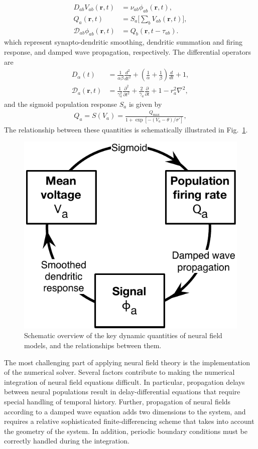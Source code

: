 \documentclass[preprint,review,10pt,authoryear,letterpaper]{elsarticle}
\begin{document}
\begin{align}
	\label{eq:summation}
	D_{ab}V_{ab}(\mathbf{r},t) &= \nu_{ab}\phi_{ab}(\mathbf{r},t),\\
	\label{eq:sigm_sum}
	Q_a(\mathbf{r},t) &= S_a \big[\sum_b V_{ab}(\mathbf{r},t) \big],\\
	\mathcal{D}_{ab}\phi_{ab}(\mathbf{r},t) &= Q_b(\mathbf{r},t-\tau_{ab}).
\end{align}
which represent synapto-dendritic smoothing, dendritic summation and firing response, and damped wave propagation, respectively. The differential operators are
\begin{align}
\label{eq:dendrite}
	D_\alpha(t) &= \frac{1}{\alpha\beta}\frac{d^2}{dt^2} + \left( \frac{1}{\alpha} + \frac{1}{\beta}\right) \frac{d}{dt}+1,\\
\label{eq:wave}
	\mathcal{D}_a(\mathbf{r},t) &= \frac{1}{\gamma_a^2}\frac{\partial^2}{\partial t^2} + \frac{2}{\gamma_a}\frac{\partial}{\partial t} + 1 - r_a^2\nabla^2,
\end{align}
and the sigmoid population response $S_a$ is given by
\begin{align}
\label{eq:sigmoid}
	Q_a = S(V_a) = \frac{Q_{\textrm{max}}}{1+\exp[-(V_a - \theta)/\sigma']},
\end{align}
The relationship between these quantities is schematically illustrated in Fig.~\ref{fig:eirs_cycle}.

\begin{figure}[!b]
\begin{center}
\includegraphics[width=0.40\columnwidth]{EIRS_cycle}
\caption{Schematic overview of the key dynamic quantities of neural field models, and the relationships between them.}
\label{fig:eirs_cycle}
\end{center}
\end{figure}

The most challenging part of applying neural field theory is the implementation of the numerical solver. Several factors contribute to making the numerical integration of neural field equations difficult. In particular, propagation delays between neural populations result in delay-differential equations that require special handling of temporal history. Further, propagation of neural fields according to a damped wave equation adds two dimensions to the system, and requires a relative sophisticated finite-differencing scheme that takes into account the geometry of the system. In addition, periodic boundary conditions must be correctly handled during the integration. 
\end{document}
